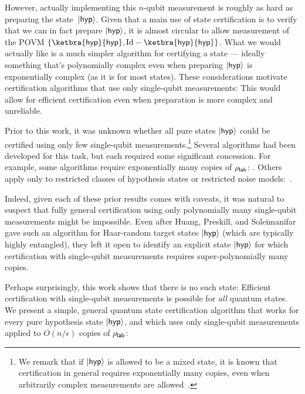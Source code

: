 However, actually implementing this $n$-qubit measurement is roughly as hard as preparing the state~$\lvert\mathsf{hyp}\rangle$. Given that a main use of state certification is to verify that we can in fact prepare $\lvert\mathsf{hyp}\rangle$, it is almost circular to allow measurement of the POVM $\{\ketbra{\tar}{\tar}, \Id - \ketbra{\tar}{\tar}\}$. What we would  actually like is a much simpler algorithm for certifying a state --- ideally something that's polynomially complex even when preparing $\lvert\mathsf{hyp}\rangle$ is exponentially complex (as it is for most states). These considerations motivate certification algorithms that use only single-qubit measurements: This would allow for efficient certification even when preparation is more complex and unreliable.

Prior to this work, it was unknown whether all pure states $\lvert\mathsf{hyp}\rangle$ could be certified using only few single-qubit measurements.\footnote{We remark that if $\lvert\mathsf{hyp}\rangle$ is allowed to be a mixed state, it is known that certification in general requires exponentially many copies, even when arbitrarily complex measurements are allowed~\cite{CHW07,swan1swan2_21}.} Several algorithms had been developed for this task, but each required some significant concession. For example, some algorithms require exponentially many copies of $\rho_{\mathsf{lab}}$: \cite{flammia2011direct,da2011practical, aolita2015reliable}. Others apply only to restricted classes of hypothesis states or restricted noise models:~\cite{hayashi2006study,flammia2011direct,aolita2015reliable,hayashi2015verifiable,morimae2016quantum,morimae2017verification,takeuchi2018verification,gluza2018fidelity,hayashi2019verifying,li2019efficient,liu2019efficient,yu2019optimal,zhu2019efficient,li2021verification,huang2024certifying}. 

Indeed, given each of these prior results comes with caveats, it was natural to suspect that fully general certification using only polynomially many single-qubit measurements might be impossible. Even after Huang, Preskill, and Soleimanifar~\cite{huang2024certifying} gave such an algorithm for Haar-random target states $\lvert\mathsf{hyp}\rangle$ (which are typically highly entangled), they left it open to identify an explicit state $\lvert\mathsf{hyp}\rangle$ for which certification with single-qubit measurements requires super-polynomially many copies.

Perhaps surprisingly, this work shows that there is no such state: Efficient certification with single-qubit measurements is possible for \emph{all} quantum states. We present a simple, general quantum state certification algorithm that works for every pure hypothesis state $\lvert\mathsf{hyp}\rangle$, and which uses only single-qubit measurements applied to $O(n/\epsilon)$ copies of $\rho_{\mathsf{lab}}$:

